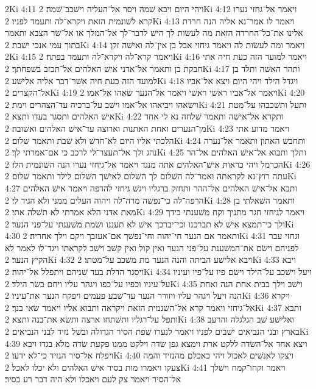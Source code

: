 2Ki 4:11  ויהי היום ויבא שׁמה ויסר אל־העליה וישׁכב־שׁמה׃
2Ki 4:12  ויאמר אל־גחזי נערו קרא לשׁונמית הזאת ויקרא־לה ותעמד לפניו׃
2Ki 4:13  ויאמר לו אמר־נא אליה הנה חרדת אלינו את־כל־החרדה הזאת מה לעשׂות לך הישׁ לדבר־לך אל־המלך או אל־שׂר הצבא ותאמר בתוך עמי אנכי ישׁבת׃
2Ki 4:14  ויאמר ומה לעשׂות לה ויאמר גיחזי אבל בן אין־לה ואישׁה זקן׃
2Ki 4:15  ויאמר קרא־לה ויקרא־לה ותעמד בפתח׃
2Ki 4:16  ויאמר למועד הזה כעת חיה אתי חבקת בן ותאמר אל־אדני אישׁ האלהים אל־תכזב בשׁפחתך׃
2Ki 4:17  ותהר האשׁה ותלד בן למועד הזה כעת חיה אשׁר־דבר אליה אלישׁע׃
2Ki 4:18  ויגדל הילד ויהי היום ויצא אל־אביו אל־הקצרים׃
2Ki 4:19  ויאמר אל־אביו ראשׁי ראשׁי ויאמר אל־הנער שׂאהו אל־אמו׃
2Ki 4:20  וישׂאהו ויביאהו אל־אמו וישׁב על־ברכיה עד־הצהרים וימת׃
2Ki 4:21  ותעל ותשׁכבהו על־מטת אישׁ האלהים ותסגר בעדו ותצא׃
2Ki 4:22  ותקרא אל־אישׁה ותאמר שׁלחה נא לי אחד מן־הנערים ואחת האתנות וארוצה עד־אישׁ האלהים ואשׁובה׃
2Ki 4:23  ויאמר מדוע אתי הלכתי אליו היום לא־חדשׁ ולא שׁבת ותאמר שׁלום׃
2Ki 4:24  ותחבשׁ האתון ותאמר אל־נערה נהג ולך אל־תעצר־לי לרכב כי אם־אמרתי לך׃
2Ki 4:25  ותלך ותבוא אל־אישׁ האלהים אל־הר הכרמל ויהי כראות אישׁ־האלהים אתה מנגד ויאמר אל־גיחזי נערו הנה השׁונמית הלז׃
2Ki 4:26  עתה רוץ־נא לקראתה ואמר־לה השׁלום לך השׁלום לאישׁך השׁלום לילד ותאמר שׁלום׃
2Ki 4:27  ותבא אל־אישׁ האלהים אל־ההר ותחזק ברגליו ויגשׁ גיחזי להדפה ויאמר אישׁ האלהים הרפה־לה כי־נפשׁה מרה־לה ויהוה העלים ממני ולא הגיד לי׃
2Ki 4:28  ותאמר השׁאלתי בן מאת אדני הלא אמרתי לא תשׁלה אתי׃
2Ki 4:29  ויאמר לגיחזי חגר מתניך וקח משׁענתי בידך ולך כי־תמצא אישׁ לא תברכנו וכי־יברכך אישׁ לא תעננו ושׂמת משׁענתי על־פני הנער׃
2Ki 4:30  ותאמר אם הנער חי־יהוה וחי־נפשׁך אם־אעזבך ויקם וילך אחריה׃
2Ki 4:31  וגחזי עבר לפניהם וישׂם את־המשׁענת על־פני הנער ואין קול ואין קשׁב וישׁב לקראתו ויגד־לו לאמר לא הקיץ הנער׃
2Ki 4:32  ויבא אלישׁע הביתה והנה הנער מת משׁכב על־מטתו׃
2Ki 4:33  ויבא ויסגר הדלת בעד שׁניהם ויתפלל אל־יהוה׃
2Ki 4:34  ויעל וישׁכב על־הילד וישׂם פיו על־פיו ועיניו על־עיניו וכפיו על־כפו ויגהר עליו ויחם בשׂר הילד׃
2Ki 4:35  וישׁב וילך בבית אחת הנה ואחת הנה ויעל ויגהר עליו ויזורר הנער עד־שׁבע פעמים ויפקח הנער את־עיניו׃
2Ki 4:36  ויקרא אל־גיחזי ויאמר קרא אל־השׁנמית הזאת ויקראה ותבוא אליו ויאמר שׂאי בנך׃
2Ki 4:37  ותבא ותפל על־רגליו ותשׁתחו ארצה ותשׂא את־בנה ותצא׃
2Ki 4:38  ואלישׁע שׁב הגלגלה והרעב בארץ ובני הנביאים ישׁבים לפניו ויאמר לנערו שׁפת הסיר הגדולה ובשׁל נזיד לבני הנביאים׃
2Ki 4:39  ויצא אחד אל־השׂדה ללקט ארת וימצא גפן שׂדה וילקט ממנו פקעת שׂדה מלא בגדו ויבא ויפלח אל־סיר הנזיד כי־לא ידעו׃
2Ki 4:40  ויצקו לאנשׁים לאכול ויהי כאכלם מהנזיד והמה צעקו ויאמרו מות בסיר אישׁ האלהים ולא יכלו לאכל׃
2Ki 4:41  ויאמר וקחו־קמח וישׁלך אל־הסיר ויאמר צק לעם ויאכלו ולא היה דבר רע בסיר׃
